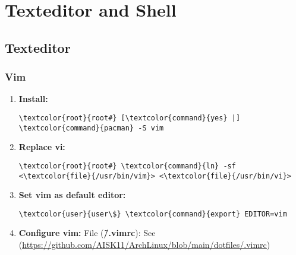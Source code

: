 \documentclass[10pt, a4paper, onecolumn, openany]{book} %
\begin{document}
\chapter{Texteditor and Shell}
\section{Texteditor}
\subsection{Vim}
\begin{enumerate}
    \item \textbf{Install:}
\begin{Verbatim}[commandchars=\\\{\}]
\textcolor{root}{root#} [\textcolor{command}{yes} |] \textcolor{command}{pacman} -S vim
\end{Verbatim}
    \item \textbf{Replace vi:}
\begin{Verbatim}[commandchars=\\\{\}]
\textcolor{root}{root#} \textcolor{command}{ln} -sf <\textcolor{file}{/usr/bin/vim}> <\textcolor{file}{/usr/bin/vi}>
\end{Verbatim}
    \item \textbf{Set vim as default editor:}
\begin{Verbatim}[commandchars=\\\{\}]
\textcolor{user}{user\$} \textcolor{command}{export} EDITOR=vim
\end{Verbatim}
    \item \textbf{Configure vim:}
\newline File (\textbf{\textcolor{file}{\~/.vimrc}}):
\newline See (\underline{\href{https://github.com/AISK11/ArchLinux/blob/main/dotfiles/.vimrc}{https://github.com/AISK11/ArchLinux/blob/main/dotfiles/.vimrc}})
\end{enumerate}
\end{document}
